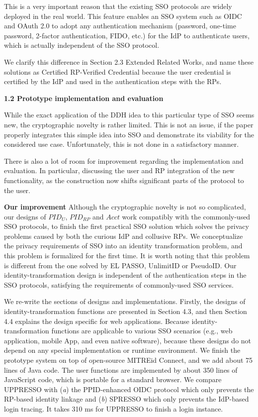 \documentclass[letterpaper,onecolumn,10pt]{article}
\begin{document}
This is a very important reason that the existing SSO protocols are widely deployed in the real world.
This feature enables an SSO system such as OIDC and OAuth 2.0 to adopt any authentication mechanism
 (password, one-time password, 2-factor authentication, FIDO, etc.) for the IdP to authenticate users, which is actually independent of the SSO protocol.

We clarify this difference in Section 2.3 Extended Related Works,
    and name these solutions as Certified RP-Verified Credential
        because the user credential is certified by the IdP and used in the authentication steps with the RPs.


\vspace{1mm}\noindent\textbf{1.2 Prototype implementation and evaluation}

While the exact application of the DDH idea to this particular type of SSO seems new, the cryptographic novelty is rather limited.
This is not an issue, if the paper properly integrates this simple idea into SSO and demonstrate its viability for the considered use case.
Unfortunately, this is not done in a satisfactory manner.

There is also a lot of room for improvement regarding the implementation and evaluation.
In particular, discussing the user and RP integration of the new functionality, as the construction now shifts significant parts of the protocol to the user.


\vspace{1mm}\noindent\textbf{Our improvement}
Although the cryptographic novelty is not so complicated,
        our designs of $PID_U$, $PID_{RP}$ and $Acct$ work compatibly with the commonly-used SSO protocols,
            to finish the first practical SSO solution which solves the privacy problems caused by both the curious IdP and collusive RPs.
We conceptualize the privacy requirements of SSO into an identity transformation problem,
    and this problem is formalized for the first time.
It is worth noting that 
        this problem is different from the one solved by EL PASSO, UnlimitID or PseudoID.
Our identity-transformation design is independent of the authentication steps in the SSO protocols,
            satisfying the requirements of commonly-used SSO services.

We re-write the sections of designs and implementations.
Firstly,
    the designs of identity-transformation functions are presented in Section 4.3,
        and then Section 4.4 explains the design specific for web applications.
Because identity-transformation functions are applicable to various SSO scenarios
        (e.g., web application, mobile App, and even native software),
    because these designs do not depend on any special implementation or runtime environment.
We finish the prototype system on top of open-source MITREid Connect,
    and we add about 75 lines of Java code.
The user functions are implemented by about 350 lines of JavaScript code,
    which is portable for a standard browser.
We compare UPPRESSO with (\emph{a}) the PPID-enhanced OIDC protocol which only prevents the RP-based identity linkage
     and (\emph{b}) SPRESSO which only prevents the IdP-based login tracing.
It takes 310 ms for UPPRESSO to finish a login instance.
\end{document}
